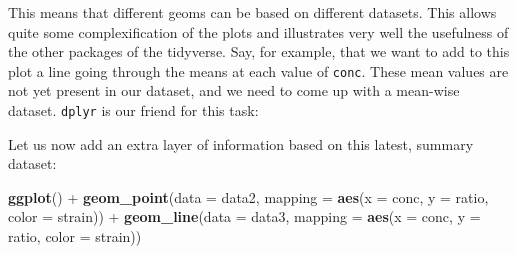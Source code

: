 \documentclass[]{book}
\newenvironment{Shaded}{}{}
\newcommand{\CommentTok}[1]{\textcolor[rgb]{0.38,0.63,0.69}{\textit{#1}}}
\newcommand{\DataTypeTok}[1]{\textcolor[rgb]{0.56,0.13,0.00}{#1}}
\newcommand{\KeywordTok}[1]{\textcolor[rgb]{0.00,0.44,0.13}{\textbf{#1}}}
\newcommand{\NormalTok}[1]{#1}
\newcommand{\OperatorTok}[1]{\textcolor[rgb]{0.40,0.40,0.40}{#1}}
\newcommand{\StringTok}[1]{\textcolor[rgb]{0.25,0.44,0.63}{#1}}
\begin{document}
This means that different geoms can be based on different datasets. This allows quite some complexification of the plots and illustrates very well the usefulness of the other packages of the tidyverse. Say, for example, that we want to add to this plot a line going through the means at each value of \texttt{conc}. These mean values are not yet present in our dataset, and we need to come up with a mean-wise dataset. \texttt{dplyr} is our friend for this task:

\begin{Shaded}
\end{Shaded}

Let us now add an extra layer of information based on this latest, summary dataset:

\begin{Shaded}
\begin{Highlighting}[]
\KeywordTok{ggplot}\NormalTok{() }\OperatorTok{+}
\StringTok{  }\KeywordTok{geom_point}\NormalTok{(}\DataTypeTok{data =}\NormalTok{ data2, }\DataTypeTok{mapping =} \KeywordTok{aes}\NormalTok{(}\DataTypeTok{x =}\NormalTok{ conc, }\DataTypeTok{y =}\NormalTok{ ratio, }\DataTypeTok{color =}\NormalTok{ strain)) }\OperatorTok{+}
\StringTok{  }\KeywordTok{geom_line}\NormalTok{(}\DataTypeTok{data =}\NormalTok{ data3, }\DataTypeTok{mapping =} \KeywordTok{aes}\NormalTok{(}\DataTypeTok{x =}\NormalTok{ conc, }\DataTypeTok{y =}\NormalTok{ ratio, }\DataTypeTok{color =}\NormalTok{ strain))}
\end{Highlighting}
\end{Shaded}
\end{document}
